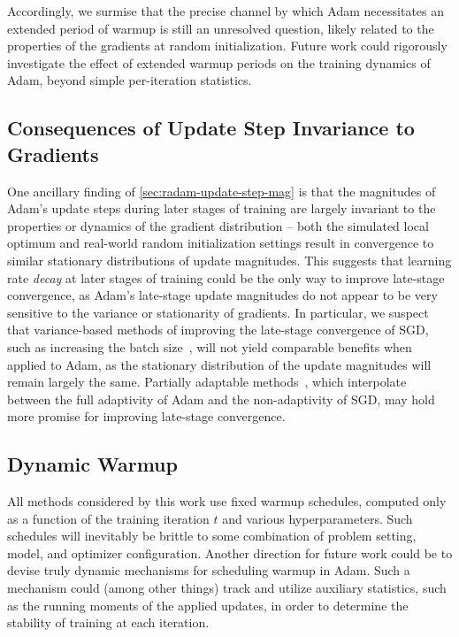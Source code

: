 {Accordingly, we surmise that the precise channel by which Adam necessitates an extended period of warmup is still an unresolved question, likely related to the properties of the gradients at random initialization. Future work could rigorously investigate the effect of extended warmup periods on the training dynamics of Adam, beyond simple per-iteration statistics.

\subsection{Consequences of Update Step Invariance to Gradients}

One ancillary finding of \cref*{sec:radam-update-step-mag} is that the magnitudes of Adam's update steps during later stages of training are largely invariant to the properties or dynamics of the gradient distribution -- both the simulated local optimum and real-world random initialization settings result in convergence to similar stationary distributions of update magnitudes. This suggests that learning rate \emph{decay} at later stages of training could be the only way to improve late-stage convergence, as Adam's late-stage update magnitudes do not appear to be very sensitive to the variance or stationarity of gradients. In particular, we suspect that variance-based methods of improving the late-stage convergence of SGD, such as increasing the batch size~\citep{smith2018batchsize}, will not yield comparable benefits when applied to Adam, as the stationary distribution of the update magnitudes will remain largely the same. Partially adaptable methods~\citep{chen2018padam, keskar2017adamsgd, luo2019adabound}, which interpolate between the full adaptivity of Adam and the non-adaptivity of SGD, may hold more promise for improving late-stage convergence.

\subsection{Dynamic Warmup}

All methods considered by this work use fixed warmup schedules, computed only as a function of the training iteration $t$ and various hyperparameters. Such schedules will inevitably be brittle to some combination of problem setting, model, and optimizer configuration. Another direction for future work could be to devise truly dynamic mechanisms for scheduling warmup in Adam. Such a mechanism could (among other things) track and utilize auxiliary statistics, such as the running moments of the applied updates, in order to determine the stability of training at each iteration.

}
